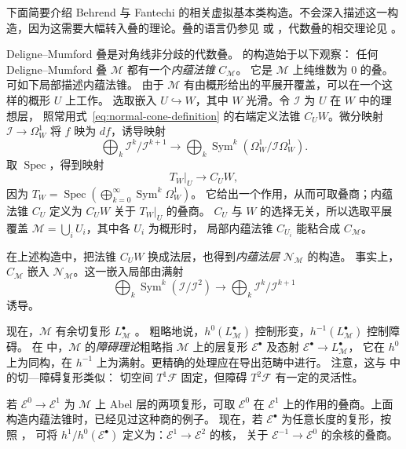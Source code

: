 下面简要介绍 Behrend 与 Fantechi  的相关虚拟基本类构造。不会深入描述这一构造，因为这需要大幅转入叠的理论。叠的语言仍参见  或 ，代数叠的相交理论见 。

Deligne--Mumford 叠是对角线非分歧的代数叠。 的构造始于以下观察：
任何 Deligne--Mumford 叠 $\mathcal M$ 都有一个\emph{内蕴法锥} $C_{\mathcal M}$。
它是 $\mathcal M$ 上纯维数为 $0$ 的叠。可如下局部描述内蕴法锥。
由于 $\mathcal M$ 有由概形给出的平展开覆盖，可以在一个这样的概形 $U$ 上工作。
选取嵌入 $U\hookrightarrow W$，其中 $W$ 光滑。令 $\mathcal I$ 为 $U$ 在 $W$ 中的理想层，
照常用式~\eqref{eq:normal-cone-definition} 的右端定义法锥 $C_UW$。微分映射
$\mathcal I\to\Omega_W^1$ 将 $f$ 映为 $df$，诱导映射
\[
\bigoplus_k\mathcal I^k/\mathcal I^{k+1}
\longrightarrow\bigoplus_k\operatorname{Sym}^k
(\Omega_W^1/\mathcal I\Omega_W^1).
\]
取 $\operatorname{Spec}$，得到映射
\[
T_W|_U\longrightarrow C_UW,
\]
因为 $T_W=\operatorname{Spec}(\bigoplus_{k=0}^\infty\operatorname{Sym}^k\Omega_W^1)$。
它给出一个作用，从而可取叠商；内蕴法锥 $C_U$ 定义为 $C_UW$ 关于 $T_W|_U$ 的叠商。
$C_U$ 与 $W$ 的选择无关，所以选取平展覆盖 $\mathcal M=\bigcup_iU_i$，其中各 $U_i$ 为概形时，
局部内蕴法锥 $C_{U_i}$ 能粘合成 $C_{\mathcal M}$。

在上述构造中，把法锥 $C_UW$ 换成法层，也得到\emph{内蕴法层} $\mathcal N_{\mathcal M}$ 的构造。
事实上，$C_{\mathcal M}$ 嵌入 $\mathcal N_{\mathcal M}$。这一嵌入局部由满射
\[
\bigoplus_k\operatorname{Sym}^k(\mathcal I/\mathcal I^2)
\longrightarrow\bigoplus_k\mathcal I^k/\mathcal I^{k+1}
\]
诱导。

现在，$\mathcal M$ 有余切复形 $L^\bullet_{\mathcal M}$ 。
粗略地说，$h^0(L^\bullet_{\mathcal M})$ 控制形变，$h^{-1}(L^\bullet_{\mathcal M})$ 控制障碍。
在  中，$\mathcal M$ 的\emph{障碍理论}粗略指 $\mathcal M$ 上的层复形
$\mathcal E^\bullet$ 及态射 $\mathcal E^\bullet\to L^\bullet_{\mathcal M}$，
它在 $h^0$ 上为同构，在 $h^{-1}$ 上为满射。更精确的处理应在导出范畴中进行。
注意，这与  中的切—障碍复形类似：
切空间 $T^1\mathcal F$ 固定，但障碍 $T^2\mathcal F$ 有一定的灵活性。

若 $\mathcal E^0\to\mathcal E^1$ 为 $\mathcal M$ 上 Abel 层的两项复形，可取
$\mathcal E^0$ 在 $\mathcal E^1$ 上的作用的叠商。上面构造内蕴法锥时，已经见过这种商的例子。
现在，若 $\mathcal E^\bullet$ 为任意长度的复形，按照 ，
可将 $h^1/h^0(\mathcal E^\bullet)$ 定义为：$\mathcal E^1\to\mathcal E^2$ 的核，
关于 $\mathcal E^{-1}\to\mathcal E^0$ 的余核的叠商。

